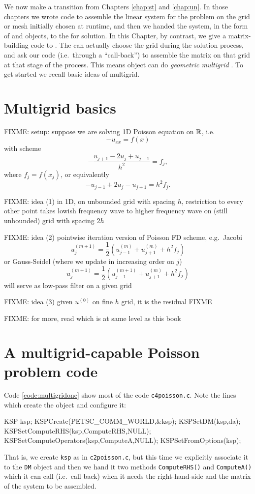 
We now make a transition from Chapters \ref{chap:st} and \ref{chap:un}.  In those chapters we wrote code to assemble the linear system for the problem on the grid or mesh initially chosen at runtime, and then we handed the system, in the form of \pMat and \pVec objects, to the \pKSP for solution.  In this Chapter, by contrast, we give a matrix-building code to \pKSP.  The \pKSP can actually choose the grid during the solution process, and ask our code (i.e.~through a ``call-back'') to assemble the matrix on that grid at that stage of the process.  This means \PETSc \pKSP object can do \emph{geometric multigrid} \citep{Briggsetal2000}.  To get started we recall basic ideas of multigrid.


\section{Multigrid basics}

FIXME: setup: suppose we are solving 1D Poisson equation on $\mathbb{R}$, i.e.
    $$- u_{xx} = f(x)$$
with scheme
    $$- \frac{u_{j+1} - 2 u_j + u_{j-1}}{h^2} = f_j,$$
where $f_j = f(x_j)$, or equivalently
    $$- u_{j-1} + 2 u_j - u_{j+1} = h^2 f_j.$$

FIXME: idea (1) in 1D, on unbounded grid with spacing $h$, restriction to every other point takes lowish frequency wave to higher frequency wave on (still unbounded) grid with spacing $2h$

FIXME: idea (2) pointwise iteration version of Poisson FD scheme, e.g.~Jacobi
   $$u_j^{(m+1)} = \frac{1}{2} \left(u_{j-1}^{(m)} + u_{j+1}^{(m)} + h^2 f_j\right) $$
or Gauss-Seidel (where we update in increasing order on $j$)
   $$u_j^{(m+1)} = \frac{1}{2} \left(u_{j-1}^{(m+1)} + u_{j+1}^{(m)} + h^2 f_j\right) $$
will serve as low-pass filter on a given grid

FIXME: idea (3) given $u^{(0)}$ on fine $h$ grid, it is the residual FIXME

FIXME: for more, read \citep{Briggsetal2000} which is at same level as this book


\section{A multigrid-capable Poisson problem code}

Code \ref{code:multigridone} show most of the code \texttt{c4poisson.c}.  Note the lines which create the \pKSP object and configure it:
\begin{code}
  KSP ksp;
  KSPCreate(PETSC_COMM_WORLD,&ksp);
  KSPSetDM(ksp,da);
  KSPSetComputeRHS(ksp,ComputeRHS,NULL);
  KSPSetComputeOperators(ksp,ComputeA,NULL);
  KSPSetFromOptions(ksp);
\end{code}
That is, we create \texttt{ksp} as in \texttt{c2poisson.c}, but this time we explicitly associate it to the \texttt{DM} object and then we hand it two methods \texttt{ComputeRHS()} and \texttt{ComputeA()} which it can call (i.e.~call back) when it needs the right-hand-side and the matrix of the system to be assembled.

